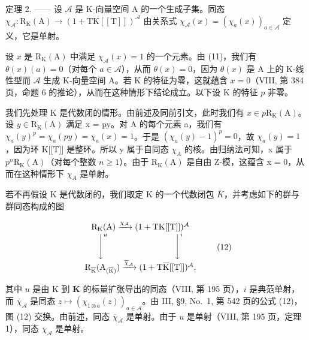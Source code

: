 定理 2. —— 设 \(\mathcal{A}\) 是 K-向量空间 A 的一个生成子集。同态 \(\chi_{\mathcal{A}}: \mathrm{R}_{\mathrm{K}}(\mathrm{A}) \to (1 + \mathrm{TK}[[\mathrm{T}]])^{\mathcal{A}}\) 由关系式 \(\chi_{\mathcal{A}}(x) = (\chi_a(x))_{a \in \mathcal{A}}\) 定义，它是单射。

设 \(x\) 是 \(\mathrm{R}_{\mathrm{K}}(\mathrm{A})\) 中满足 \(\chi_{\mathcal{A}}(x) = 1\) 的一个元素。由 (11)，我们有 \(\theta(x)(a) = 0\)（对每个 \(a \in \mathcal{A}\)），从而 \(\theta(x) = 0\)，因为 \(\theta(x)\) 是 A 上的 K-线性型而 \(\mathcal{A}\) 生成 K-向量空间 A。若 K 的特征为零，这就蕴含 \(x = 0\)（VIII, 第 384 页，命题 6 的推论），从而在这种情形下结论成立。以下设 K 的特征 \(p\) 非零。

我们先处理 K 是代数闭的情形。由前述及同前引文，此时我们有 \(x \in p \mathrm{R}_{\mathrm{K}}(\mathrm{A})\)。设 \(y \in \mathrm{R}_{\mathrm{K}}(\mathrm{A})\) 满足 x = py。对 A 的每个元素 a，我们有 \(\chi_{a}(y)^{p} = \chi_{a}(py) = \chi_{a}(x) = 1\)。于是 \((\chi_{a}(y) - 1)^{p} = 0\)，故 \(\chi_{a}(y) = 1\)，因为环 K{[}{[}T{]}{]} 是整环。所以 y 属于自同态 \(\chi_{A}\) 的核。由归纳法可知，x 属于 \(p^{n}\mathrm{R}_{\mathrm{K}}(\mathrm{A})\)（对每个整数 \(n \geqslant 1\)）。由于 \(\mathrm{R}_{\mathrm{K}}(\mathrm{A})\) 是自由 Z-模，这蕴含 x = 0，从而在这种情形下 \(\chi_{A}\) 是单射。

若不再假设 K 是代数闭的，我们取定 K 的一个代数闭包 \(\overline{K}\)，并考虑如下的群与群同态构成的图

\[
\begin{array}{c} \mathrm{R} _ {\mathrm{K}} (\mathrm{A}) \xrightarrow {\chi_ {\mathcal {A}}} (1 + \mathrm{TK} [ [ \mathrm{T} ] ]) ^ {\mathcal {A}} \\ \Biggl \downarrow^ {u} \qquad \qquad \qquad \qquad \Biggl \downarrow^ {i} \\ \mathrm{R} _ {\overline {{\mathrm{K}}}} (\mathrm{A} _ {(\overline {{\mathrm{K}}})}) \xrightarrow {\overline {{\chi}} _ {\mathcal {A}}} (1 + \mathrm{T} \overline {{\mathrm{K}}} [ [ \mathrm{T} ] ]) ^ {\mathcal {A}}, \end{array}\tag{12}
\]

其中 \(u\) 是由 K 到 \(\overline{\mathbf{K}}\) 的标量扩张导出的同态（VIII, 第 195 页），\(i\) 是典范单射，而 \(\overline{\chi}_{\mathcal{A}}\) 是同态 \(z \mapsto (\chi_{1 \otimes a}(z))_{a \in \mathcal{A}}\)。由 III, §9, No.~1, 第 542 页的公式 (12)，图 (12) 交换。由前述，同态 \(\overline{\chi}_{\mathcal{A}}\) 是单射。由于 \(u\) 是单射（VIII, 第 195 页，定理 1），同态 \(\chi_{\mathcal{A}}\) 是单射。

